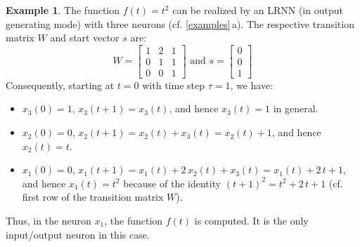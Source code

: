 \documentclass[preprint,12pt,times,authoryear]{elsarticle}%
\theoremstyle{definition}
\newtheorem{exmp}{Example}
\begin{document}
\begin{exmp}\label{parabola}
The function $f(t) = t^2$ can be realized by an LRNN (in output generating mode)
with three neurons (cf. \cref{examples}\,a). The respective transition matrix
$W$ and start vector $s$ are:
\[ W = \left[ \begin{array}{ccc}
	1 & 2 & 1\\
	0 & 1 & 1\\
	0 & 0 & 1
   \end{array} \right]
   \text{~and~} s = \left[ \begin{array}{c}
	0\\
	0\\
	1
   \end{array} \right]
\]
Consequently, starting at $t=0$ with time step $\tau=1$, we have:
\begin{itemize}
  \item $x_3(0) = 1$, $x_3(t+1) = x_3(t)$, and hence $x_3(t)=1$ in general.
  \item $x_2(0) = 0$, $x_2(t+1) = x_2(t)+x_3(t) = x_2(t)+1$, and hence $x_2(t)=t$.
  \item $x_1(0) = 0$, $x_1(t+1) = x_1(t)+ 2\,x_2(t) + x_3(t) = x_1(t)+ 2\,t +
	1$, and hence $x_1(t) = t^2$ because of the identity $(t+1)^2 = t^2 +
	2\,t + 1$ (cf. first row of the transition matrix $W$).
\end{itemize}
Thus, in the neuron $x_1$, the function $f(t)$ is computed. It is the only
input/output neuron in this case.
\end{exmp}
\end{document}
